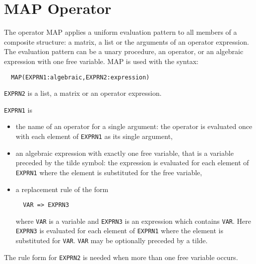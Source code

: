 \section{MAP Operator}
The operator MAP applies a uniform evaluation pattern
to all members of a composite structure: a matrix, a list or the arguments
of an operator expression. The evaluation pattern can be a
unary procedure, an operator, or an algebraic expression with
one free variable. MAP is used with the syntax:
\begin{verbatim}
  MAP(EXPRN1:algebraic,EXPRN2:expression)
\end{verbatim}
{\tt EXPRN2} is a list, a matrix or an operator expression.

{\tt EXPRN1} is
\begin{itemize}
\item the name of an operator for a single argument: the operator
 is evaluated once with each element of {\tt EXPRN1} as its single argument,
\item an algebraic expression with exactly one free variable, that is
a variable preceded by the tilde symbol: the expression
 is evaluated for each element of {\tt EXPRN1} where the element is
 substituted for the free variable,
\item a replacement rule of the form
\begin{verbatim}
  VAR => EXPRN3
\end{verbatim} 
  where {\tt VAR} is a variable and {\tt EXPRN3} is an expression
  which contains {\tt VAR}.
  Here {\tt EXPRN3} is evaluated for each element of {\tt EXPRN1} where 
  the element is substituted for  {\tt VAR}. {\tt VAR} may be 
  optionally preceded by a tilde.
\end{itemize}
The rule form for {\tt EXPRN2} is needed when more than
one free variable occurs.

